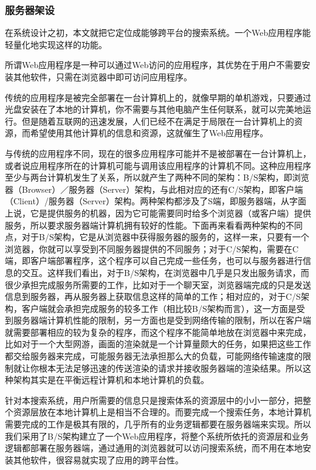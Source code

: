 \documentclass[12pt,a4paper]{article}
\begin{document}
	\subsubsection{服务器架设}
	
	在系统设计之初，本文就把它定位成能够跨平台的搜索系统。一个Web应用程序能轻量化地实现这样的功能。
	
	所谓{\Times Web}应用程序是一种可以通过{\Times Web}访问的应用程序，其优势在于用户不需要安装其他软件，只需在浏览器中即可访问应用程序。
	
	传统的应用程序是被完全部署在一台计算机上的，就像早期的单机游戏，只要通过光盘安装在了本地的计算机，你不需要与其他电脑产生任何联系，就可以完美地运行。但是随着互联网的迅速发展，人们已经不在满足于局限在一台计算机上的资源，而希望使用其他计算机的信息和资源，这就催生了Web应用程序。
	
	与传统的应用程序不同，现在的很多应用程序可能并不是被部署在一台计算机上，或者说应用程序所在的计算机可能与调用该应用程序的计算机不同。这种应用程序至少与两台计算机发生了关系，所以就产生了两种不同的架构：{\Times B/S}架构，即浏览器（{\Times Browser}）／服务器（{\Times Server}）架构，与此相对应的还有{\Times C/S}架构，即客户端（{\Times Client}）/服务器（{\Times Server}）架构。两种架构都涉及了{\Times S}端，即服务器端，从字面上说，它是提供服务的机器，因为它可能需要同时给多个浏览器（或客户端）提供服务，所以要求服务器端计算机拥有较好的性能。下面再来看看两种架构的不同点，对于{\Times B/S}架构，它是从浏览器中获得服务器的服务的，这样一来，只要有一个浏览器，你就可以享受到不同服务器提供的不同服务；对于{\Times C/S}架构，需要在{\Times C}端，即客户端部署程序，这个程序可以自己完成一些任务，也可以与服务器进行信息的交互。这样我们看出，对于{\Times B/S}架构，在浏览器中几乎是只发出服务请求，而很少承担完成服务所需要的工作，比如对于一个聊天室，浏览器端完成的只是发送信息到服务器，再从服务器上获取信息这样的简单的工作；相对应的，对于{\Times C/S}架构，客户端就会承担完成服务的较多工作（相比较{\Times B/S}架构而言），这一方面是受到服务器端计算机性能的限制，另一方面也是受到网络传输的限制，所以在客户端就需要部署相应的较为复杂的程序，而这个程序不能简单地放在浏览器中来完成，比如对于一个大型网游，画面的渲染就是一个计算量颇大的任务，如果把这些工作都交给服务器来完成，可能服务器无法承担那么大的负载，可能网络传输速度的限制就让你根本无法足够迅速的传送渲染的请求并接收服务器端的渲染结果。所以这种架构其实是在平衡远程计算机和本地计算机的负载。
	
	针对本搜索系统，用户所需要的信息只是搜索体系的资源层中的小小一部分，把整个资源层放在本地计算机上是相当不合理的。而要完成一个搜索任务，本地计算机需要完成的工作是极其有限的，几乎所有的业务逻辑都要在服务器端来实现。所以我们采用了{\Times B/S}架构建立了一个{\Times Web}应用程序，将整个系统所依托的资源层和业务逻辑都部署在服务器端，通过通用的浏览器就可以访问搜索系统，而不用在本地安装其他软件，很容易就实现了应用的跨平台性。
	
\end{document}
